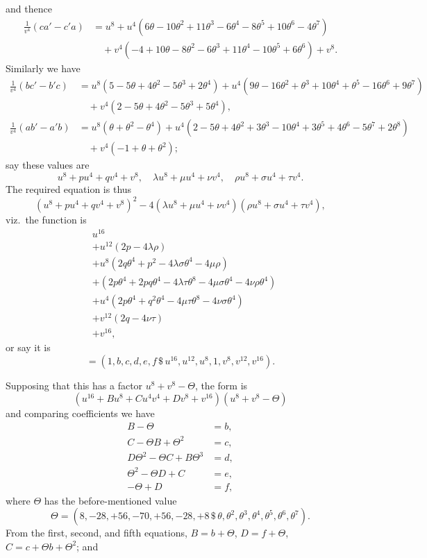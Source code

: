 \documentclass[11pt]{article}
\begin{document}
\noindent and thence
\begin{align*}
\frac{1}{v^{4}}(ca' - c'a) &= u^{8} + u^{4}(6\theta - 10\theta^{2} + 11\theta^{3} - 6\theta^{4} - 8\theta^{5} + 10\theta^{6} - 4\theta^{7})\\
&\quad + v^{4}(-4 + 10\theta - 8\theta^{2} - 6\theta^{3} + 11\theta^{4} - 10\theta^{5} + 6\theta^{6}) + v^{8}.
\end{align*}
Similarly we have
\begin{align*}
\frac{1}{v^{4}}(bc' - b'c) &= u^{8}(5 - 5\theta + 4\theta^{2} - 5\theta^{3} + 2\theta^{4}) + u^{4}(9\theta - 16\theta^{2} + \theta^{3} + 10\theta^{4} + \theta^{5} - 16\theta^{6} + 9\theta^{7})\\
&\quad + v^{4}(2 - 5\theta + 4\theta^{2} - 5\theta^{3} + 5\theta^{4}),\\[4pt]
\frac{1}{v^{4}}(ab' - a'b) &= u^{8}(\theta + \theta^{2} - \theta^{4}) + u^{4}(2 - 5\theta + 4\theta^{2} + 3\theta^{3} - 10\theta^{4} + 3\theta^{5} + 4\theta^{6} - 5\theta^{7} + 2\theta^{8})\\
&\quad + v^{4}(-1 + \theta + \theta^{2});
\end{align*}
say these values are
\[
u^{8} + p u^{4} + q v^{4} + v^{8},\quad \lambda u^{8} + \mu u^{4} + \nu v^{4},\quad \rho u^{8} + \sigma u^{4} + \tau v^{4}.
\]
The required equation is thus
\[
(u^{8} + p u^{4} + q v^{4} + v^{8})^{2} - 4(\lambda u^{8} + \mu u^{4} + \nu v^{4})(\rho u^{8} + \sigma u^{4} + \tau v^{4}),
\]
viz.\ the function is
\begin{align*}
& u^{16}\\
&+ u^{12}(2p - 4\lambda\rho)\\
&+ u^{8}(2q\theta^{4} + p^{2} - 4\lambda\sigma\theta^{4} - 4\mu\rho)\\
&+ (2p\theta^{4} + 2pq\theta^{4} - 4\lambda\tau\theta^{8} - 4\mu\sigma\theta^{4} - 4\nu\rho\theta^{4})\\
&+ u^{4}(2p\theta^{4} + q^{2}\theta^{4} - 4\mu\tau\theta^{8} - 4\nu\sigma\theta^{4})\\
&+ v^{12}(2q - 4\nu\tau)\\
&+ v^{16},
\end{align*}
or say it is
\[
= (1, b, c, d, e, f\,\$\,u^{16}, u^{12}, u^{8}, 1, v^{8}, v^{12}, v^{16}).
\]

Supposing that this has a factor $u^{8} + v^{8} - \Theta$, the form is
\[
(u^{16} + Bu^{8} + Cu^{4}v^{4} + Dv^{8} + v^{16})(u^{8} + v^{8} - \Theta)
\]
and comparing coefficients we have
\begin{align*}
B - \Theta &= b,\\
C - \Theta B + \Theta^{2} &= c,\\
D\Theta^{2} - \Theta C + B\Theta^{3} &= d,\\
\Theta^{2} - \Theta D + C &= e,\\
-\Theta + D &= f,
\end{align*}
where $\Theta$ has the before-mentioned value
\[
\Theta = (8, -28, +56, -70, +56, -28, +8\,\$\,\theta, \theta^{2}, \theta^{3}, \theta^{4}, \theta^{5}, \theta^{6}, \theta^{7}).
\]
From the first, second, and fifth equations, $B = b + \Theta$, $D = f + \Theta$, $C = c + \Theta b + \Theta^{2}$; and
\end{document}

